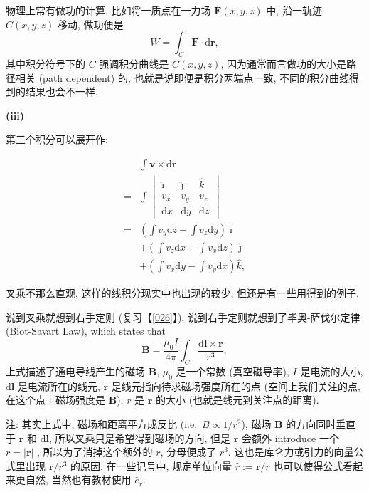物理上常有做功的计算, 比如将一质点在一力场 $\boldsymbol{F}(x,y,z)$ 中,
沿一轨迹 $C(x,y,z)$ 移动, 做功便是 \[
W=\int_C\boldsymbol{F}\cdot\mathrm{d}\boldsymbol{r},
\] 其中积分符号下的 $C$ 强调积分曲线是 $C(x,y,z)$,
因为通常而言做功的大小是路径相关 (path dependent) 的,
也就是说即便是积分两端点一致, 不同的积分曲线得到的结果也会不一样.

\textbf{(iii)}

第三个积分可以展开作:

\[
\begin{aligned}
&\int\boldsymbol{v}\times\mathrm{d}\boldsymbol{r}\\
=&\int\begin{vmatrix}\hat{\imath}&\hat{\jmath}&\hat{k}\\v_x&v_y&v_z\\\mathrm{d}x&\mathrm{d}y&\mathrm{d}z\end{vmatrix}\\
=&\left(\int v_y\mathrm{d}z-\int v_z\mathrm{d}y\right)\hat{\imath}\\
&+\left(\int v_z\mathrm{d}x-\int v_x\mathrm{d}z\right)\hat{\jmath}\\
&+\left(\int v_x\mathrm{d}y-\int v_y\mathrm{d}x\right)\hat{k},
\end{aligned}
\]

叉乘不那么直观, 这样的线积分现实中也出现的较少,
但还是有一些用得到的例子.

\begin{newquote}
说到叉乘就想到右手定则 (复习【\ref{026}】),
说到右手定则就想到了毕奥-萨伐尔定律 (Biot-Savart Law), which states that
\[
\boldsymbol{B}=\frac{\mu_0I}{4\pi}\int_C\frac{\mathrm{d}\boldsymbol{l}\times \boldsymbol{r}}{r^3},
\] 上式描述了通电导线产生的磁场 $\boldsymbol{B}$, $\mu_0$ 是一个常数
(真空磁导率), $I$ 是电流的大小, $\mathrm{d}\boldsymbol{l}$
是电流所在的线元, $\boldsymbol{r}$ 是线元指向待求磁场强度所在的点
(空间上我们关注的点, 在这个点上磁场强度是 $\boldsymbol{B}$), $r$ 是
$\boldsymbol{r}$ 的大小 (也就是线元到关注点的距离).

注: 其实上式中, 磁场和距离平方成反比 (i.e.~$B\propto1/r^2$), 磁场
$\boldsymbol{B}$ 的方向同时垂直于 $\boldsymbol{r}$ 和
$\mathrm{d}\boldsymbol{l}$, 所以叉乘只是希望得到磁场的方向, 但是
$\boldsymbol{r}$ 会额外 introduce 一个 $r=|\boldsymbol{r}|$ ,
所以为了消掉这个额外的 $r$, 分母便成了 $r^3$.
这也是库仑力或引力的向量公式里出现 $\boldsymbol{r}/r^3$ 的原因.
在一些记号中, 规定单位向量 $\hat{r}:=\boldsymbol{r}/r$
也可以使得公式看起来更自然, 当然也有教材使用 $\hat{e}_r$.
\end{newquote}

